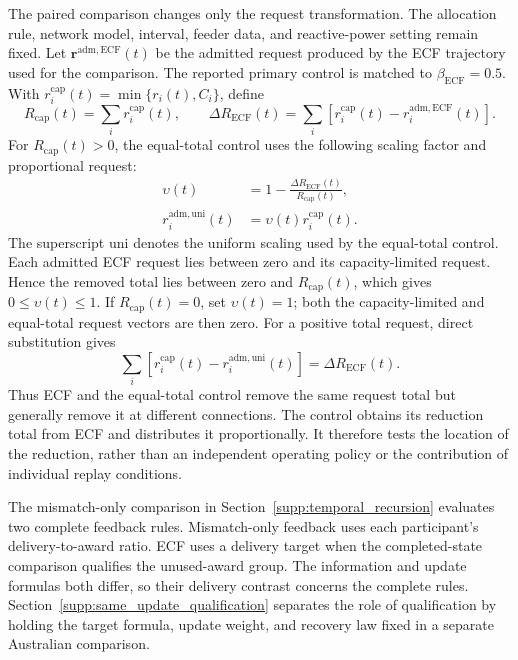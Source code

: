 \documentclass[11pt]{article}
\begin{document}
The paired comparison changes only the request transformation. The allocation
rule, network model, interval, feeder data, and reactive-power setting remain
fixed. Let $\mathbf r^{\mathrm{adm,ECF}}(t)$ be the admitted request produced by
the ECF trajectory used for the comparison. The reported primary control is
matched to $\beta_{\mathrm{ECF}}=0.5$. With
$r_i^{\mathrm{cap}}(t)=\min\{r_i(t),C_i\}$, define
\begin{equation}
R_{\mathrm{cap}}(t)=\sum_i r_i^{\mathrm{cap}}(t),
\qquad
\Delta R_{\mathrm{ECF}}(t)=
\sum_i\left[r_i^{\mathrm{cap}}(t)-r_i^{\mathrm{adm,ECF}}(t)\right].
\label{eq:supp_ecf_request_reduction}
\end{equation}
For $R_{\mathrm{cap}}(t)>0$, the equal-total control uses the following scaling
factor and proportional request:
\begin{equation}
\begin{aligned}
\upsilon(t)
&=1-\frac{\Delta R_{\mathrm{ECF}}(t)}{R_{\mathrm{cap}}(t)},\\
r_i^{\mathrm{adm,uni}}(t)&=\upsilon(t)r_i^{\mathrm{cap}}(t).
\end{aligned}
\label{eq:supp_equal_total_request}
\end{equation}
The superscript $\mathrm{uni}$ denotes the uniform scaling used by the
equal-total control. Each admitted ECF request lies between zero and its
capacity-limited request. Hence the removed total lies between zero and
$R_{\mathrm{cap}}(t)$, which gives $0\le\upsilon(t)\le1$. If
$R_{\mathrm{cap}}(t)=0$, set $\upsilon(t)=1$; both
the capacity-limited and equal-total request vectors are then zero. For a
positive total request, direct substitution gives
\begin{equation}
\sum_i\left[r_i^{\mathrm{cap}}(t)-r_i^{\mathrm{adm,uni}}(t)\right]
=\Delta R_{\mathrm{ECF}}(t).
\label{eq:supp_equal_request_reduction_identity}
\end{equation}
Thus ECF and the equal-total control remove the same request total but generally
remove it at different connections.
The control obtains its reduction total from ECF and distributes it
proportionally. It therefore tests the location of the reduction, rather than
an independent operating policy or the contribution of individual replay conditions.

The mismatch-only comparison in Section~\ref{supp:temporal_recursion} evaluates
two complete feedback rules. Mismatch-only feedback uses each participant's
delivery-to-award ratio. ECF uses a delivery target when the completed-state
comparison qualifies the unused-award group. The information and update
formulas both differ, so their delivery contrast concerns the complete rules.
Section~\ref{supp:same_update_qualification} separates the role of qualification
by holding the target formula, update weight, and recovery law fixed in a
separate Australian comparison.
\end{document}
